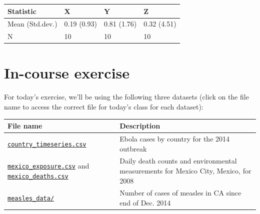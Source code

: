 \documentclass[]{book}
\theoremstyle{definition}
\theoremstyle{definition}
\theoremstyle{definition}
\theoremstyle{remark}
\begin{document}
\begin{tabular}{l|l|l|l}
\hline
Statistic & X & Y & Z\\
\hline
Mean (Std.dev.) & 0.19 (0.93) & 0.81 (1.76) & 0.32 (4.51)\\
\hline
N & 10 & 10 & 10\\
\hline
\end{tabular}

\section{In-course exercise}\label{in-course-exercise-5}

For today's exercise, we'll be using the following three datasets (click
on the file name to access the correct file for today's class for each
dataset):

\begin{longtable}[]{@{}ll@{}}
\toprule
\begin{minipage}[b]{0.27\columnwidth}\raggedright\strut
File name\strut
\end{minipage} & \begin{minipage}[b]{0.63\columnwidth}\raggedright\strut
Description\strut
\end{minipage}\tabularnewline
\midrule
\endhead
\begin{minipage}[t]{0.27\columnwidth}\raggedright\strut
\href{https://github.com/geanders/RProgrammingForResearch/raw/master/data/country_timeseries.csv}{\texttt{country\_timeseries.csv}}\strut
\end{minipage} & \begin{minipage}[t]{0.63\columnwidth}\raggedright\strut
Ebola cases by country for the 2014 outbreak\strut
\end{minipage}\tabularnewline
\begin{minipage}[t]{0.27\columnwidth}\raggedright\strut
\href{https://github.com/geanders/RProgrammingForResearch/raw/master/data/mexico_exposure.csv}{\texttt{mexico\_exposure.csv}}
and
\href{https://github.com/geanders/RProgrammingForResearch/raw/master/data/mexico_deaths.csv}{\texttt{mexico\_deaths.csv}}\strut
\end{minipage} & \begin{minipage}[t]{0.63\columnwidth}\raggedright\strut
Daily death counts and environmental measurements for Mexico City,
Mexico, for 2008\strut
\end{minipage}\tabularnewline
\begin{minipage}[t]{0.27\columnwidth}\raggedright\strut
\href{https://github.com/geanders/RProgrammingForResearch/tree/master/data/measles_data}{\texttt{measles\_data/}}\strut
\end{minipage} & \begin{minipage}[t]{0.63\columnwidth}\raggedright\strut
Number of cases of measles in CA since end of Dec. 2014\strut
\end{minipage}\tabularnewline
\bottomrule
\end{longtable}
\end{document}
